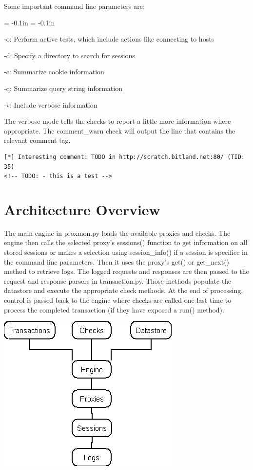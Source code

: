 \documentclass{article}
\newenvironment{mindesc}{\begin{description}\parsep = -0.1in \itemsep = -0.1in}{\end{description}}
\begin{document}
Some important command line parameters are:
\begin{mindesc}
\item[-o:] Perform active tests, which include actions like connecting to hosts
\item[-d:] Specify a directory to search for sessions
\item[-c:] Summarize cookie information
\item[-q:] Summarize query string information
\item[-v:] Include verbose information
\end{mindesc}

The verbose mode tells the checks to report a little more information where appropriate.
The comment\_warn check will output the line that contains the relevant comment tag.
\begin{lstlisting}[style=output]
[*] Interesting comment: TODO in http://scratch.bitland.net:80/ (TID: 35)
<!-- TODO: - this is a test -->
\end{lstlisting}

\section{Architecture Overview}
The main engine in proxmon.py loads the available proxies and checks.  The engine
then calls the selected proxy's sessions() function to get 
information on all stored sessions or makes a selection using session\_info() if a
session is specifiec in the command line parameters.  Then it uses the proxy's 
get() or get\_next() method to retrieve logs.
The logged requests and responses are then passed to the request and response parsers in 
transaction.py.  
Those methods populate the datastore and execute the appropriate check methods.
At the end of processing, control is passed back to the engine where checks are called
one last time to process the completed transaction (if they have exposed a run() method).

\includegraphics[scale=0.45]{arch.png}
\end{document}
